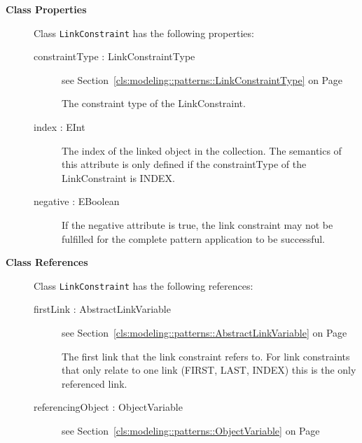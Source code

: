 \begin{description}

	\item[\textbf{Class Properties}] Class \texttt{LinkConstraint} has the following properties:
	\begin{description}
\item[constraintType : LinkConstraintType 	]
see Section~\ref{cls:modeling::patterns::LinkConstraintType} on Page~\pageref{cls:modeling::patterns::LinkConstraintType}
\hspace{\fill}
\nopagebreak


	
			
The constraint type of the LinkConstraint.	
		
	
\item[index : EInt 	]

\hspace{\fill}
\nopagebreak


	
			
The index of the linked object in the collection. The semantics of this attribute is only defined if the constraintType of the LinkConstraint is INDEX.	
		
	
\item[negative : EBoolean 	]

\hspace{\fill}
\nopagebreak


	
			
If the negative attribute is true, the link constraint may not be fulfilled for the complete pattern application to be successful.	
		
	
	\end{description}
	
	\item[\textbf{Class References}] Class \texttt{LinkConstraint} has the following references:
	\begin{description}
\item[firstLink : AbstractLinkVariable 	]
see Section~\ref{cls:modeling::patterns::AbstractLinkVariable} on Page~\pageref{cls:modeling::patterns::AbstractLinkVariable}
\hspace{\fill}
\nopagebreak


	
			
The first link that the link constraint refers to. For link constraints that only relate to one link (FIRST, LAST, INDEX) this is the only referenced link.	
		
	
\item[referencingObject : ObjectVariable 	]
see Section~\ref{cls:modeling::patterns::ObjectVariable} on Page~\pageref{cls:modeling::patterns::ObjectVariable}
\hspace{\fill}
\nopagebreak



\end{description}
\end{description}
